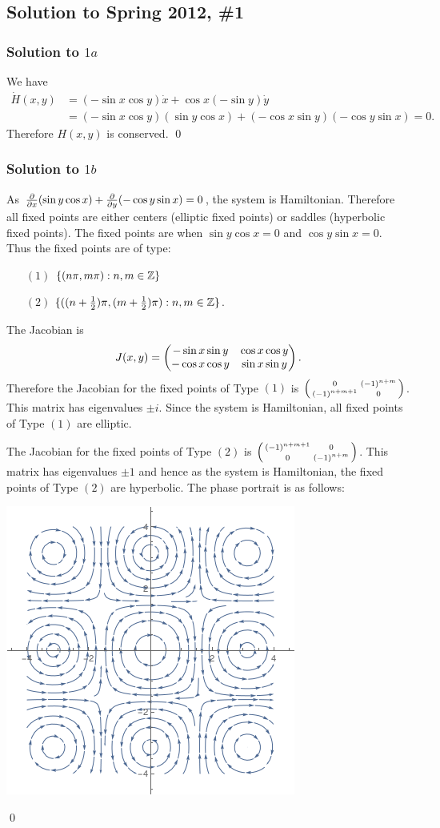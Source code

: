 \subsection*{Solution to Spring 2012, \#1}\label{s121}
\subsubsection*{Solution to $1a$}
We have
\begin{align*}
\dot{H}(x, y) &= (-\sin x  \cos y)\dot{x} + \cos x(-\sin y) \dot{y}\\
&= (-\sin x\cos y)(\sin y\cos x) + (-\cos x\sin y)(-\cos y\sin x) = 0.
\end{align*}
Therefore $H(x, y)$ is conserved.
\hfill\qed

\subsubsection*{Solution to $1b$}
As $\frac{\partial }{\partial x}(\sin y\cos x) + \frac{\partial}{\partial y}(-\cos y\sin x) = 0$, the system is Hamiltonian.
Therefore all fixed points are either centers (elliptic fixed points) or saddles (hyperbolic fixed points).
The fixed points are when $\sin y\cos x = 0$ and $\cos y \sin x = 0$. Thus the fixed points are of type:
\begin{enumerate}
\item[$(1)$] $\{(n\pi, m\pi): n, m \in \mathbb{Z}\}$
\item[$(2)$] $\{((n + \frac{1}{2})\pi, (m + \frac{1}{2})\pi): n, m \in \mathbb{Z}\}$.
\end{enumerate}
The Jacobian is
$$J(x, y) = \begin{pmatrix} -\sin x\sin y & \cos x\cos y \\ -\cos x\cos y & \sin x\sin y\end{pmatrix}.$$
Therefore the Jacobian for the fixed points of Type $(1)$ is $\left(\begin{smallmatrix} 0 & (-1)^{n+ m} \\ (-1)^{n + m + 1} & 0\end{smallmatrix}\right)$.
This matrix has eigenvalues $\pm i$. Since the system is Hamiltonian, all fixed points
of Type $(1)$ are elliptic.

The Jacobian for the fixed points of Type $(2)$ is $\left(\begin{smallmatrix} (-1)^{n + m + 1} & 0 \\ 0 & (-1)^{n + m}\end{smallmatrix}\right)$. This matrix
has eigenvalues $\pm 1$ and hence as the system is Hamiltonian, the fixed points of Type $(2)$ are hyperbolic.
The phase portrait is as follows:

\begin{center}
\includegraphics[scale=0.60]{./_Figures/S121.png}
\end{center}
\hfill\qed

